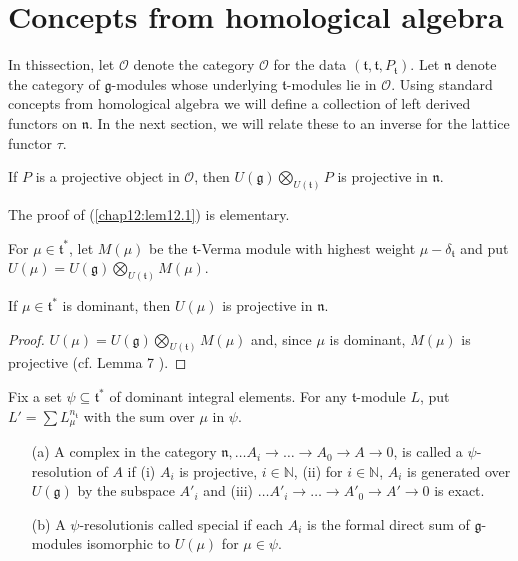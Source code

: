 
\chapter{Concepts from homological algebra}\label{sec12}

In this\pageoriginale section, let $\mathscr{O}$ denote the category
$\mathscr{O}$ for the data $(\mathfrak{t}, \mathfrak{t},
P_\mathfrak{t})$. Let $\mathfrak{n}$ denote the category of
$\mathfrak{g}$-modules whose underlying $\mathfrak{t}$-modules lie in
$\mathscr{O}$. Using standard concepts from homological algebra we
will define a collection of left derived functors on
$\mathfrak{n}$. In the next section, we will relate these to an
inverse for the lattice functor $\tau$. 

\begin{lemma}\label{chap12:lem12.1}
If $P$ is a projective object in $\mathscr{O}$, then $U(\mathfrak{g})
\bigotimes\limits_{U(\mathfrak{t})} P$ is projective in
$\mathfrak{n}$. 
\end{lemma}

The proof of (\ref{chap12:lem12.1}) is elementary. 

For $\mu \in \mathfrak{t}^*$, let $M(\mu)$ be the
$\mathfrak{t}$-Verma module with highest weight $\mu
-\delta_\mathfrak{t}$ and put $U(\mu) = U(\mathfrak{g})
\bigotimes\limits_{U(\mathfrak{t})} M(\mu)$. 

\begin{coro}\label{chap12:coro12.2}
If $\mu \in \mathfrak{t}^*$ is dominant, then $U(\mu)$ is projective
in $\mathfrak{n}$. 
\end{coro}

\begin{proof}
$U(\mu) = U(\mathfrak{g}) \bigotimes\limits_{U(\mathfrak{t})} M(\mu)$
  and, since $\mu$ is dominant, $M(\mu)$ is projective (cf. Lemma 7
  \cite{key12}). 
\end{proof}

Fix a set $\psi \subseteq \mathfrak{t}^*$ of dominant integral
elements. For any $\mathfrak{t}$-module $L$, put $L'=\sum
L^{n_\mathfrak{t}}_\mu$ with the sum over $\mu$ in $\psi$. 


\begin{definition}\label{chap12:def12.3}
\begin{itemize}
\item[{\rm (a)}]  A complex in the category $\mathfrak{n}, \ldots A_i \to  \ldots
  \to A_0 \to A \to 0 $, is called a $\psi$-resolution of $A$ if (i)
  $A_i$ is projective, $i \in \mathbb{N}$, (ii) for $i \in
  \mathbb{N}$, $A_i$ is generated over $U(\mathfrak{g})$ by the
  subspace $A'_i$ and (iii) $\ldots A'_i \to \ldots \to A'_0 \to A'
  \to 0$ is exact. 

\item[{\rm (b)}] A $\psi$-resolution\pageoriginale is called special if each $A_i$
  is the formal direct sum of $\mathfrak{g}$-modules isomorphic to
  $U(\mu)$ for $\mu \in \psi$. 
\end{itemize}
\end{definition}

